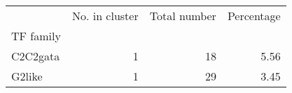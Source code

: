 \begin{tabular}{lrrr}
\toprule
{} &  No. in cluster &  Total number &  Percentage \\
TF family &                 &               &             \\
\midrule
C2C2gata  &               1 &            18 &        5.56 \\
G2like    &               1 &            29 &        3.45 \\
\bottomrule
\end{tabular}
